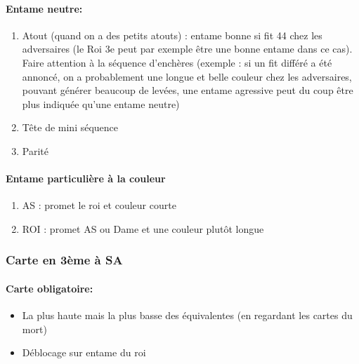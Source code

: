 \documentclass[a4paper]{article}
\begin{document}
\paragraph{Entame neutre:}

\begin{enumerate}
\item Atout (quand on a des petits atouts) : entame bonne si fit 44 chez les adversaires (le Roi 3e peut par exemple être une bonne entame dans ce cas). Faire attention à la séquence d’enchères (exemple : si un fit différé a été annoncé, on a probablement une longue et belle couleur chez les adversaires, pouvant générer beaucoup de levées, une entame agressive peut du coup être plus indiquée qu’une entame neutre)

\item Tête de mini séquence

\item Parité

\end{enumerate}

\paragraph{Entame particulière à la couleur}

\begin{enumerate}
\item AS : promet le roi et couleur courte

\item ROI : promet AS ou Dame et une couleur plutôt longue

\end{enumerate}

\subsubsection{Carte en 3ème à SA}

\paragraph{Carte obligatoire:}

\begin{itemize}
\item La plus haute mais la plus basse des équivalentes (en regardant les cartes du mort)

\item Déblocage sur entame du roi

\end{itemize}
\end{document}
